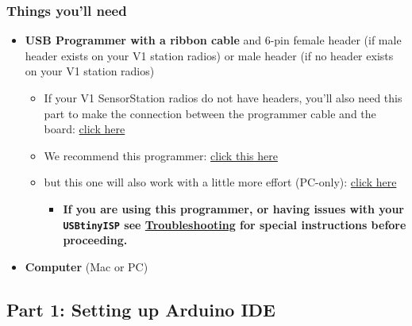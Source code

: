 \documentclass[
]{article}
\providecommand{\tightlist}{%
  \setlength{\itemsep}{0pt}\setlength{\parskip}{0pt}}
\begin{document}
\hypertarget{things-youll-need}{%
\subsubsection{Things you'll need}\label{things-youll-need}}

\begin{itemize}
\tightlist
\item
  \textbf{USB Programmer with a ribbon cable} and 6-pin female header
  (if male header exists on your V1 station radios) or male header (if
  no header exists on your V1 station radios)

  \begin{itemize}
  \tightlist
  \item
    If your V1 SensorStation radios do not have headers, you'll also
    need this part to make the connection between the programmer cable
    and the board: \href{https://www.sparkfun.com/products/12807}{click
    here}
  \item
    We recommend this programmer:
    \href{https://www.amazon.com/USBtinyISP-Programmer-Bootloader-Download-Interface/dp/B01FDD4EP0/ref=sr_1_1?crid=3AEXHPTVD9KER\&dchild=1\&keywords=usbtinyisp\&qid=1593638163\&sprefix=usbtiny\%2Caps\%2C149\&sr=8-1}{click
    this here}
  \item
    but this one will also work with a little more effort (PC-only):
    \href{https://www.amazon.com/ARCELI-USBASP-USBasp_H6-Programmer-Support/dp/B0785RQ766/ref=sr_1_12?dchild=1\&keywords=bootloader\&qid=1593638232\&s=electronics\&sr=1-12}{click
    here}

    \begin{itemize}
    \tightlist
    \item
      \textbf{If you are using this programmer, or having issues with
      your \texttt{USBtinyISP} see
      \protect\hyperlink{troubleshooting}{Troubleshooting} for special
      instructions before proceeding.}
    \end{itemize}
  \end{itemize}
\item
  \textbf{Computer} (Mac or PC)
\end{itemize}

\hypertarget{part-1-setting-up-arduino-ide}{%
\subsection{Part 1: Setting up Arduino
IDE}\label{part-1-setting-up-arduino-ide}}
\end{document}
